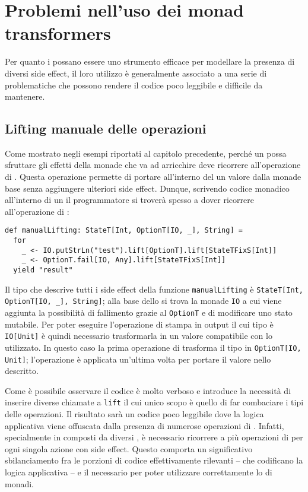 \section{Problemi nell'uso dei monad transformers}

Per quanto i  possano essere uno strumento efficace per modellare la presenza di diversi side effect, il loro utilizzo è generalmente associato a una serie di problematiche che possono rendere il codice poco leggibile e difficile da mantenere.

\subsection{Lifting manuale delle operazioni}
Come mostrato negli esempi riportati al capitolo precedente, perché un  possa sfruttare gli effetti della monade che va ad arricchire deve ricorrere all'operazione di . Questa operazione permette di portare all'interno del  un valore dalla monade base senza aggiungere ulteriori side effect.
Dunque, scrivendo codice monadico all'interno di un  il programmatore si troverà spesso a dover ricorrere all'operazione di :
\begin{lstlisting}[language=scala3]
def manualLifting: StateT[Int, OptionT[IO, _], String] =
  for
    _ <- IO.putStrLn("test").lift[OptionT].lift[StateTFixS[Int]]
    _ <- OptionT.fail[IO, Any].lift[StateTFixS[Int]]
  yield "result"
\end{lstlisting}
Il tipo che descrive tutti i side effect della funzione \lstinline{manualLifting} è \lstinline{StateT[Int, OptionT[IO, _], String]}; alla base dello  si trova la monade \lstinline{IO} a cui viene aggiunta la possibilità di fallimento grazie al  \lstinline{OptionT} e di modificare uno stato mutabile.
Per poter eseguire l'operazione di stampa in output il cui tipo è \lstinline{IO[Unit]} è quindi necessario trasformarla in un valore compatibile con lo  utilizzato. In questo caso la prima operazione di  trasforma il tipo in \lstinline{OptionT[IO, Unit]}; l'operazione è applicata un'ultima volta per portare il valore nello  descritto.

Come è possibile osservare il codice è molto verboso e introduce la necessità di inserire diverse chiamate a \lstinline{lift} il cui unico scopo è quello di far combaciare i tipi delle operazioni.
Il risultato sarà un codice poco leggibile dove la logica applicativa viene offuscata dalla presenza di numerose operazioni di .
Infatti, specialmente in  composti da diversi , è necessario ricorrere a più operazioni di  per ogni singola azione con side effect. Questo comporta un significativo sbilanciamento fra le porzioni di codice effettivamente rilevanti -- che codificano la logica applicativa -- e il  necessario per poter utilizzare correttamente lo  di monadi.

